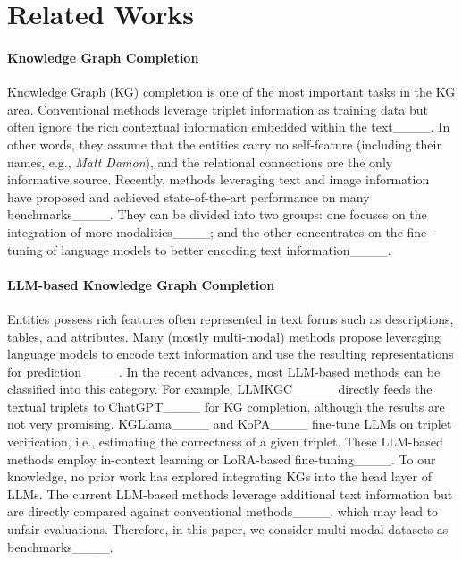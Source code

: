 \section{Related Works}
\label{sec:related}

\paragraph{Knowledge Graph Completion}
Knowledge Graph (KG) completion is one of the most important tasks in the KG area. Conventional methods leverage triplet information as training data but often ignore the rich contextual information embedded within the text____. In other words, they assume that the entities carry no self-feature (including their names, e.g., \textit{Matt Damon}), and the relational connections are the only informative source. Recently, methods leveraging text and image information have proposed and achieved state-of-the-art performance on many benchmarks____. They can be divided into two groups: one focuses on the integration of more modalities____; and the other concentrates on the fine-tuning of language models to better encoding text information____. 

\paragraph{LLM-based Knowledge Graph Completion}
Entities possess rich features often represented in text forms such as descriptions, tables, and attributes. Many (mostly multi-modal) methods propose leveraging language models to encode text information and use the resulting representations for prediction____. In the recent advances, most LLM-based methods can be classified into this category. For example, LLMKGC ____ directly feeds the textual triplets to ChatGPT____ for KG completion, although the results are not very promising. KGLlama____ and KoPA____ fine-tune LLMs on triplet verification, i.e., estimating the correctness of a given triplet. These LLM-based methods employ in-context learning or LoRA-based fine-tuning____. To our knowledge, no prior work has explored integrating KGs into the head layer of LLMs. The current LLM-based methods leverage additional text information but are directly compared against conventional methods____, which may lead to unfair evaluations. Therefore, in this paper, we consider multi-modal datasets as benchmarks____.


